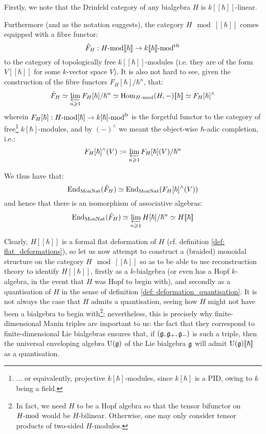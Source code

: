             \begin{remark} \label{remark: formal_properties_of_drinfeld_categories}
                Firstly, we note that the Drinfeld category of any bialgebra $H$ is $k[\![\hbar]\!]$-linear.
                
                Furthermore (and as the notation suggests), the category $H\mod[\![\hbar]\!]$ comes equipped with a fibre functor:
                    $$\hat{F}_H: H\mod[\![\hbar]\!] \to k[\![\hbar]\!]\mod^{\tfr}$$
                to the category of topologically free $k[\![\hbar]\!]$-modules (i.e. they are of the form $V[\![\hbar]\!]$ for some $k$-vector space $V$). It is also not hard to see, given the construction of the fibre functors $F_H[\hbar]/\hbar^n$, that:
                    $$\hat{F}_H \cong \projlim_{n \geq 1} F_H[\hbar]/\hbar^n \cong \Hom_{H\mod}(H, -)[\![\hbar]\!] \cong F_H[\hbar]^{\wedge}$$
                wherein $F_H[\hbar]: H\mod[\hbar] \to k[\hbar]\mod^{\fr}$ is the forgetful functor to the category of free\footnote{... or equivalently, projective $k[\hbar]$-modules, since $k[\hbar]$ is a PID, owing to $k$ being a field.} $k[\hbar]$-modules, and by $(-)^{\wedge}$ we meant the object-wise $\hbar$-adic completion, i.e.:
                    $$F_H[\hbar]^{\wedge}(V) := \projlim_{n \geq 1} F_H[\hbar](V)/\hbar^n$$
                
                We thus have that:
                    $$\End_{\Mon\Nat}(\hat{F}_H) \cong \End_{\Mon\Nat}(F_H[\hbar]^{\wedge}(V))$$
                and hence that there is an isomorphism of associative algebras:
                    $$\End_{\Mon\Nat}(\hat{F}_H) \cong \projlim_{n \geq 1} H[\hbar]/\hbar^n \cong H[\![\hbar]\!]$$
            \end{remark}
            Clearly, $H[\![\hbar]\!]$ is a formal flat deformation of $H$ (cf. definition \ref{def: flat_deformations}), so let us now attempt to construct a (braided) monoidal structure on the category $H\mod[\![\hbar]\!]$ so as to be able to use reconstruction theory to identify $H[\![\hbar]\!]$, firstly as a $k$-bialgebra (or even has a Hopf $k$-algebra, in the event that $H$ was Hopf to begin with), and secondly as a quantisation of $H$ in the sense of definition \ref{def: deformation_quantisation}. It is not always the case that $H$ admits a quantisation, seeing how $H$ might not have been a bialgebra to begin with\footnote{In fact, we need $H$ to be a Hopf algebra so that the tensor bifunctor on $H\mod$ would be $H$-bilinear. Otherwise, one may only consider tensor products of two-sided $H$-modules.}; nevertheless, this is precisely why finite-dimensional Manin triples are important to us: the fact that they correspond to finite-dimensional Lie bialgebras ensures that, if $(\g, \g_+, \g_-)$ is such a triple, then the universal enveloping algebra $\rmU(\g)$ of the Lie bialgebra $\g$ will admit $\rmU(\g)[\![\hbar]\!]$ as a quantisation.
    
    \printbibliography

